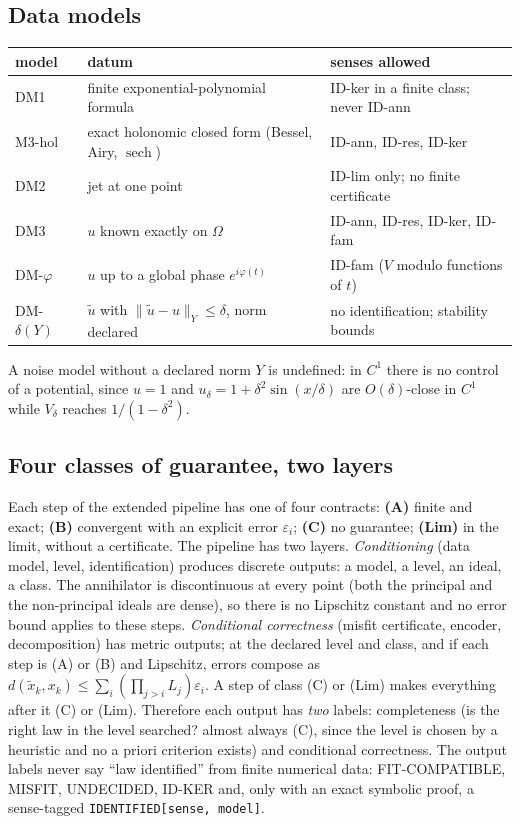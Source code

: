 \documentclass[11pt]{article}
\theoremstyle{plain}
\theoremstyle{definition}
\theoremstyle{remark}
\newcommand{\lab}[1]{\textsf{#1}}           %
\newcommand{\FC}{\lab{FIT-COMPATIBLE}}
\newcommand{\IDK}{\lab{ID-KER}}
\newcommand{\MIS}{\lab{MISFIT}}
\newcommand{\UND}{\lab{UNDECIDED}}
\begin{document}
\subsection{Data models}
\begin{center}\small
\begin{tabular}{@{}lp{5.4cm}p{4.4cm}@{}}
\toprule
model & datum & senses allowed\\
\midrule
DM1 & finite exponential-polynomial formula & ID-ker in a finite class; never ID-ann\\
M3-hol & exact holonomic closed form (Bessel, Airy, $\operatorname{sech}$) & ID-ann, ID-res, ID-ker\\
DM2 & jet at one point & ID-lim only; no finite certificate\\
DM3 & $u$ known exactly on $\Omega$ & ID-ann, ID-res, ID-ker, ID-fam\\
DM-$\varphi$ & $u$ up to a global phase $e^{i\varphi(t)}$ & ID-fam ($V$ modulo functions of $t$)\\
DM-$\delta(Y)$ & $\tilde u$ with $\lVert\tilde u-u\rVert_Y\le\delta$, norm declared & no identification; stability bounds\\
\bottomrule
\end{tabular}
\end{center}
A noise model without a declared norm $Y$ is undefined: in $C^1$ there is no control of a potential, since $u=1$ and
$u_\delta=1+\delta^2\sin(x/\delta)$ are $O(\delta)$-close in $C^1$ while $V_\delta$ reaches $1/(1-\delta^2)$.

\subsection{Four classes of guarantee, two layers}
Each step of the extended pipeline has one of four contracts: \textbf{(A)} finite and exact; \textbf{(B)} convergent with an explicit
error $\varepsilon_i$; \textbf{(C)} no guarantee; \textbf{(Lim)} in the limit, without a certificate. The pipeline has two layers.
\emph{Conditioning} (data model, level, identification) produces discrete outputs: a model, a level, an ideal, a class. The annihilator is
discontinuous at every point (both the principal and the non-principal ideals are dense), so there is no Lipschitz constant and no error bound applies to these steps.
\emph{Conditional correctness} (misfit certificate, encoder, decomposition) has metric outputs; at the declared level and class, and if each step is (A) or (B) and Lipschitz,
errors compose as $d(\tilde x_k,x_k)\le\sum_i(\prod_{j>i}L_j)\varepsilon_i$. A step of class (C) or (Lim) makes everything after it (C) or (Lim).
Therefore each output has \emph{two} labels: completeness (is the right law in the level searched? almost always (C), since the level is chosen by a heuristic and no a priori criterion
exists) and conditional correctness. The output labels never say ``law identified'' from finite numerical data: \FC, \MIS, \UND, \IDK{} and, only with an exact symbolic proof, a sense-tagged \texttt{IDENTIFIED[sense, model]}.
\end{document}
